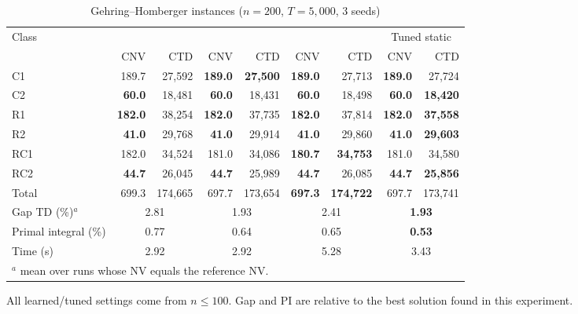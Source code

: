 \begin{table}[t]
\centering
\caption{Gehring--Homberger instances ($n=200$, $T=5{,}000$, 3 seeds)}\label{tab:hg200}
\setlength{\tabcolsep}{3.5pt}
\begin{adjustbox}{max width=\linewidth}
\begin{tabular}{lrrrrrrrr}
\toprule
Class & \multicolumn{2}{c}{\Uni{}} & \multicolumn{2}{c}{\Rw{}} & \multicolumn{2}{c}{\sgalns{}} & \multicolumn{2}{c}{Tuned static}\\
\cmidrule(lr){2-3}\cmidrule(lr){4-5}\cmidrule(lr){6-7}\cmidrule(lr){8-9}
 & CNV & CTD & CNV & CTD & CNV & CTD & CNV & CTD\\ \midrule
C1 & 189.7 & 27,592 & \textbf{189.0} & \textbf{27,500} & \textbf{189.0} & 27,713 & \textbf{189.0} & 27,724\\
C2 & \textbf{60.0} & 18,481 & \textbf{60.0} & 18,431 & \textbf{60.0} & 18,498 & \textbf{60.0} & \textbf{18,420}\\
R1 & \textbf{182.0} & 38,254 & \textbf{182.0} & 37,735 & \textbf{182.0} & 37,814 & \textbf{182.0} & \textbf{37,558}\\
R2 & \textbf{41.0} & 29,768 & \textbf{41.0} & 29,914 & \textbf{41.0} & 29,860 & \textbf{41.0} & \textbf{29,603}\\
RC1 & 182.0 & 34,524 & 181.0 & 34,086 & \textbf{180.7} & \textbf{34,753} & 181.0 & 34,580\\
RC2 & \textbf{44.7} & 26,045 & \textbf{44.7} & 25,989 & \textbf{44.7} & 26,085 & \textbf{44.7} & \textbf{25,856}\\
\midrule Total & 699.3 & 174,665 & 697.7 & 173,654 & \textbf{697.3} & \textbf{174,722} & 697.7 & 173,741\\
\midrule Gap TD (\%)$^{a}$ & \multicolumn{2}{c}{2.81} & \multicolumn{2}{c}{1.93} & \multicolumn{2}{c}{2.41} & \multicolumn{2}{c}{\textbf{1.93}}\\
Primal integral (\%) & \multicolumn{2}{c}{0.77} & \multicolumn{2}{c}{0.64} & \multicolumn{2}{c}{0.65} & \multicolumn{2}{c}{\textbf{0.53}}\\
Time (s) & \multicolumn{2}{c}{2.92} & \multicolumn{2}{c}{2.92} & \multicolumn{2}{c}{5.28} & \multicolumn{2}{c}{3.43}\\
\bottomrule
\multicolumn{9}{l}{\footnotesize $^{a}$ mean over runs whose NV equals the reference NV.}\\
\end{tabular}
\end{adjustbox}
\par\vspace{2pt}\parbox{\linewidth}{\footnotesize All learned/tuned settings come from $n\le100$. Gap and PI are relative to the best solution found in this experiment.}
\end{table}
